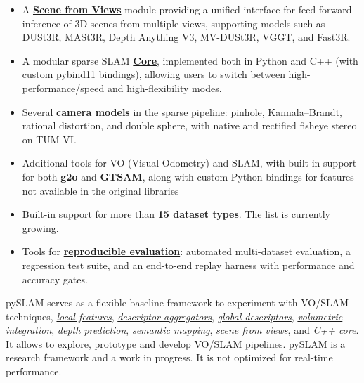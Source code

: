 \documentclass{article}
\begin{document}
\begin{itemize}
    \item A \textbf{\protect\hyperlink{scene-from-views}{Scene from Views}} module providing a unified interface for feed-forward inference of 3D scenes from multiple views, supporting models such as DUSt3R\cite{wang2023dust3r}, MASt3R\cite{leroy2024grounding}, Depth Anything V3\cite{depthanything3}, MV-DUSt3R\cite{tang2025mv}, VGGT\cite{wang2025vggt}, and Fast3R\cite{yang2025fast3r}.
    
    \item A modular sparse SLAM \textbf{\protect\hyperlink{cpp-core}{Core}}, implemented both in Python and C++ (with custom pybind11 bindings), allowing users to switch between high-performance/speed and high-flexibility modes.

    \item Several \textbf{\protect\hyperlink{camera-models}{camera models}} in the sparse pipeline: pinhole, Kannala--Brandt\cite{kannala2006generic}, rational distortion, and double sphere\cite{usenko2018double}, with native and rectified fisheye stereo on TUM-VI\cite{schubert2018tumvi}.
    
    \item Additional tools for VO (Visual Odometry) and SLAM, with built-in
    support for both \textbf{g2o}\cite{g2o_kummerle} and \textbf{GTSAM}\cite{factor_graphs_for_robot_perception}, along with custom
    Python bindings for features not available in the original libraries

    \item Built-in support for more than \textbf{\protect\hyperlink{datasets}{15 dataset
    types}}. The list is currently growing.

    \item Tools for \textbf{\protect\hyperlink{evaluating-slam}{reproducible evaluation}}: automated multi-dataset evaluation, a regression test suite, and an end-to-end replay harness with performance and accuracy gates.
\end{itemize}

pySLAM serves as a flexible baseline framework to experiment with VO/SLAM
techniques, \emph{\protect\hyperlink{supported-local-features}{local
features}},
\emph{\protect\hyperlink{supported-global-descriptors-and-local-descriptor-aggregation-methods}{descriptor
aggregators}},
\emph{\protect\hyperlink{supported-global-descriptors-and-local-descriptor-aggregation-methods}{global
descriptors}},
\emph{\protect\hyperlink{volumetric-reconstruction-pipeline}{volumetric
integration}}, \emph{\protect\hyperlink{depth-prediction}{depth
prediction}}, \emph{\protect\hyperlink{semantic-mapping}{semantic
mapping}}, \emph{\protect\hyperlink{scene-from-views}{scene from views}}, and \emph{\protect\hyperlink{cpp-core}{C++ core}}. It allows to explore, prototype and develop VO/SLAM
pipelines. pySLAM is a research framework and a work in progress. It is
not optimized for real-time performance.
\end{document}
